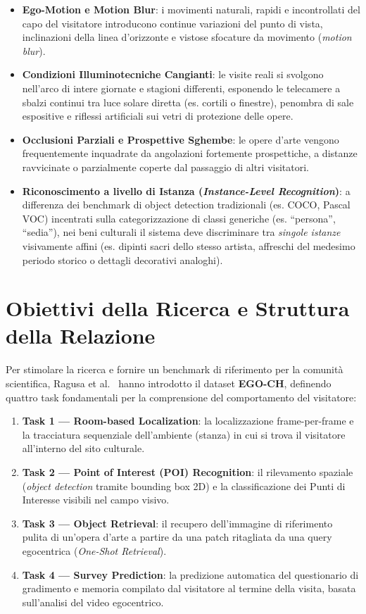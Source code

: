 \documentclass[a4paper,12pt]{report}
\begin{document}
\begin{itemize}
    \item \textbf{Ego-Motion e Motion Blur}: i movimenti naturali, rapidi e incontrollati del capo del visitatore introducono continue variazioni del punto di vista, inclinazioni della linea d'orizzonte e vistose sfocature da movimento (\emph{motion blur}).
    \item \textbf{Condizioni Illuminotecniche Cangianti}: le visite reali si svolgono nell'arco di intere giornate e stagioni differenti, esponendo le telecamere a sbalzi continui tra luce solare diretta (es. cortili o finestre), penombra di sale espositive e riflessi artificiali sui vetri di protezione delle opere.
    \item \textbf{Occlusioni Parziali e Prospettive Sghembe}: le opere d'arte vengono frequentemente inquadrate da angolazioni fortemente prospettiche, a distanze ravvicinate o parzialmente coperte dal passaggio di altri visitatori.
    \item \textbf{Riconoscimento a livello di Istanza (\emph{Instance-Level Recognition})}: a differenza dei benchmark di object detection tradizionali (es. COCO, Pascal VOC) incentrati sulla categorizzazione di classi generiche (es. ``persona'', ``sedia''), nei beni culturali il sistema deve discriminare tra \emph{singole istanze} visivamente affini (es. dipinti sacri dello stesso artista, affreschi del medesimo periodo storico o dettagli decorativi analoghi).
\end{itemize}

\section{Obiettivi della Ricerca e Struttura della Relazione}

Per stimolare la ricerca e fornire un benchmark di riferimento per la comunità scientifica, Ragusa et al.~\cite{egoref} hanno introdotto il dataset \textbf{EGO-CH}, definendo quattro task fondamentali per la comprensione del comportamento del visitatore:

\begin{enumerate}
    \item \textbf{Task 1 --- Room-based Localization}: la localizzazione frame-per-frame e la tracciatura sequenziale dell'ambiente (stanza) in cui si trova il visitatore all'interno del sito culturale.
    \item \textbf{Task 2 --- Point of Interest (POI) Recognition}: il rilevamento spaziale (\emph{object detection} tramite bounding box 2D) e la classificazione dei Punti di Interesse visibili nel campo visivo.
    \item \textbf{Task 3 --- Object Retrieval}: il recupero dell'immagine di riferimento pulita di un'opera d'arte a partire da una patch ritagliata da una query egocentrica (\emph{One-Shot Retrieval}).
    \item \textbf{Task 4 --- Survey Prediction}: la predizione automatica del questionario di gradimento e memoria compilato dal visitatore al termine della visita, basata sull'analisi del video egocentrico.
\end{enumerate}
\end{document}
